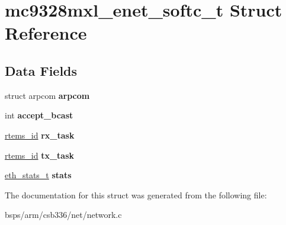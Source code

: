 \hypertarget{structmc9328mxl__enet__softc__t}{}\section{mc9328mxl\+\_\+enet\+\_\+softc\+\_\+t Struct Reference}
\label{structmc9328mxl__enet__softc__t}
\subsection*{Data Fields}
\begin{DoxyCompactItemize}
\item 
\mbox{\label{structmc9328mxl__enet__softc__t_af24c392e0c1e3f8d8084263b3e78a422}} 
struct arpcom {\bfseries arpcom}
\item 
\mbox{\label{structmc9328mxl__enet__softc__t_a7b2c8976f5668b8db9bb8fabb4a5dbac}} 
int {\bfseries accept\+\_\+bcast}
\item 
\mbox{\label{structmc9328mxl__enet__softc__t_a2b21539f832baa2181c16229da1f6f64}} 
\mbox{\hyperlink{group__ClassicTasks_gab20892b814dced7dd4e5b9bf42becd57}{rtems\+\_\+id}} {\bfseries rx\+\_\+task}
\item 
\mbox{\label{structmc9328mxl__enet__softc__t_aef6b00dca29730400b887ec57b7d26c9}} 
\mbox{\hyperlink{group__ClassicTasks_gab20892b814dced7dd4e5b9bf42becd57}{rtems\+\_\+id}} {\bfseries tx\+\_\+task}
\item 
\mbox{\label{structmc9328mxl__enet__softc__t_a2737373c09557585fcd70a567caf967c}} 
\mbox{\hyperlink{structeth__stats__t}{eth\+\_\+stats\+\_\+t}} {\bfseries stats}
\end{DoxyCompactItemize}


The documentation for this struct was generated from the following file\+:\begin{DoxyCompactItemize}
\item 
bsps/arm/csb336/net/network.\+c\end{DoxyCompactItemize}

